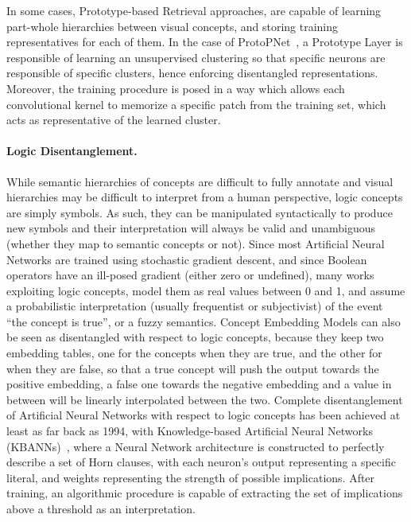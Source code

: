 In some cases, Prototype-based Retrieval approaches, are capable of learning part-whole hierarchies between visual concepts, and storing training representatives for each of them. In the case of ProtoPNet~\cite{chen2019looks}, a Prototype Layer is responsible of learning an unsupervised clustering so that specific neurons are responsible of specific clusters, hence enforcing disentangled representations. Moreover, the training procedure is posed in a way which allows each convolutional kernel to memorize a specific patch from the training set, which acts as representative of the learned cluster.

\paragraph{Logic Disentanglement.} While semantic hierarchies of concepts are difficult to fully annotate and visual hierarchies may be difficult to interpret from a human perspective, logic concepts are simply symbols. As such, they can be manipulated syntactically to produce new symbols and their interpretation will always be valid and unambiguous (whether they map to semantic concepts or not). 
Since most Artificial Neural Networks are trained using stochastic gradient descent, and since Boolean operators have an ill-posed gradient (either zero or undefined), many works exploiting logic concepts, model them as real values between 0 and 1, and assume a probabilistic interpretation (usually frequentist or subjectivist) of the event ``the concept is true'', or a fuzzy semantics. Concept Embedding Models can also be seen as disentangled with respect to logic concepts, because they keep two embedding tables, one for the concepts when they are true, and the other for when they are false, so that a true concept will push the output towards the positive embedding, a false one towards the negative embedding and a value in between will be linearly interpolated between the two.
%
Complete disentanglement of Artificial Neural Networks with respect to logic concepts has been achieved at least as far back as 1994, with Knowledge-based Artificial Neural Networks (KBANNs)~\cite{towell1994knowledge}, where a Neural Network architecture is constructed to perfectly describe a set of Horn clauses, with each neuron's output representing a specific literal, and weights representing the strength of possible implications. After training, an algorithmic procedure is capable of extracting the set of implications above a threshold as an interpretation.

